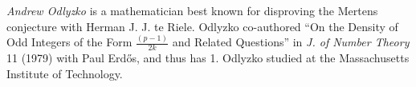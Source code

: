 \documentclass[12pt]{article}
\begin{document}
\emph{Andrew Odlyzko} is a mathematician best known for disproving the Mertens conjecture with Herman J. J. te Riele. Odlyzko co-authored ``On the Density of Odd Integers of the Form $\displaystyle \frac{(p-1)}{2k}$ and Related Questions'' in {\it J. of Number Theory} 11 (1979) with Paul Erd\H{o}s, and thus has  1. Odlyzko studied at the Massachusetts Institute of Technology.
\end{document}
